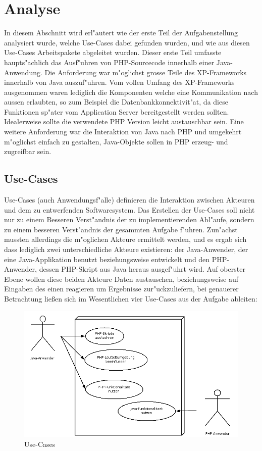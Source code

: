 \section{Analyse}
\label{sec:chap1:ana}

In diesem Abschnitt wird erl"autert wie der erste Teil der Aufgabenstellung analysiert wurde, welche Use-Cases dabei gefunden 
wurden, und wie aus diesen Use-Cases Arbeitspakete abgeleitet wurden. Dieser erste Teil umfasste haupts"achlich das Ausf"uhren 
von PHP-Sourcecode innerhalb einer Java-Anwendung. 
Die Anforderung war m"oglichst grosse Teile des XP-Frameworks innerhalb von Java auszuf"uhren.
Vom vollen Umfang des XP-Frameworks ausgenommen waren lediglich die Komponenten welche eine Kommunikation
nach aussen erlaubten, so zum Beispiel die Datenbankkonnektivit"at, da diese Funktionen sp"ater vom Application Server
bereitgestellt werden sollten. Idealerweise sollte die verwendete PHP Version leicht austauschbar sein. Eine weitere
Anforderung war die Interaktion von Java nach PHP und umgekehrt m"oglichst einfach zu gestalten, Java-Objekte sollen
in PHP erzeug- und zugreifbar sein.

\subsection{Use-Cases}
\label{sec:chap1:ana:uc}

Use-Cases (auch Anwendungsf"alle) definieren die Interaktion zwischen Akteuren und dem zu entwerfenden Softwaresystem.
Das Erstellen der Use-Cases soll nicht nur zu einem Besseren Verst"andnis der zu implementierenden Abl"aufe, sondern
zu einem besseren Verst"andnis der gesammten Aufgabe f"uhren. Zun"achst mussten allerdings die m"oglichen Akteure ermittelt
werden, und es ergab sich dass lediglich zwei unterschiedliche Akteure existieren: der Java-Anwender, der eine Java-Applikation
benutzt beziehungsweise entwickelt und den PHP-Anwender, dessen PHP-Skript aus Java heraus ausgef"uhrt wird. Auf oberster Ebene
wollen diese beiden Akteure Daten austauschen, beziehungsweise auf Eingaben des einen reagieren um Ergebnisse zur"uckzuliefern,
bei genauerer Betrachtung lie\ss en sich im Wesentlichen vier Use-Cases aus der Aufgabe ableiten:

\begin{figure}[h]
\includegraphics[width=\textwidth]{chap1/img/usecases.png}
\caption{Use-Cases}
\label{fig:usecases}
\end{figure}

